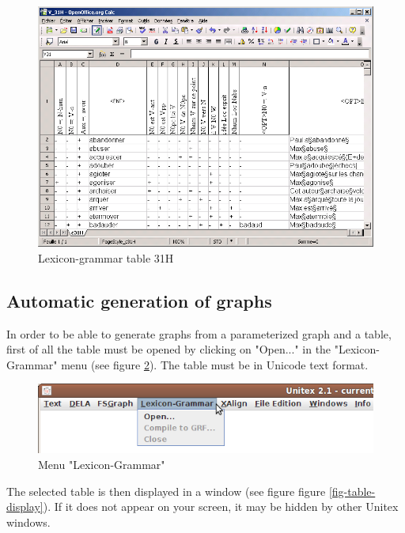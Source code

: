 \begin{figure}[!ht]
\begin{center}
\includegraphics[width=15cm]{resources/img/fig8-4.png}
\caption{Lexicon-grammar table 31H\label{fig-table-31H}}
\end{center}
\end{figure}


\subsection{Automatic generation of graphs}
In order to be able to generate graphs from a parameterized graph and a table,
first of all the table must be opened by clicking on "Open..." in the 
"Lexicon-Grammar" menu (see figure \ref{fig-lexicon-grammar-menu}). The table
must be in Unicode text format.

\begin{figure}[!ht]
\begin{center}
\includegraphics[width=12cm]{resources/img/fig8-5.png}
\caption{Menu "Lexicon-Grammar"\label{fig-lexicon-grammar-menu}}
\end{center}
\end{figure}

\bigskip
\noindent The selected table is then displayed in a window (see figure figure
\ref{fig-table-display}). If it does not appear on your screen, it may be
hidden by other Unitex windows.


